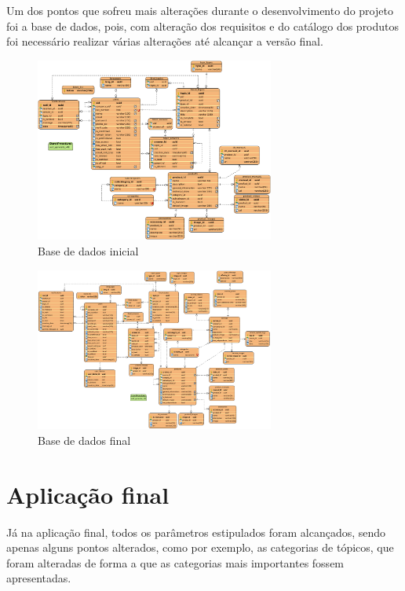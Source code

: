 Um dos pontos que sofreu mais alterações durante o desenvolvimento do projeto foi a base de dados, pois, com alteração dos requisitos e do catálogo dos produtos foi necessário realizar várias alterações até alcançar a versão final.

\begin{figure}[htb]
  \centering
  \includegraphics[width=0.7\textwidth]{images/diagramas/diagrama_bd.png}
  \caption{Base de dados inicial}
  \label{fig:79}
\end{figure}

\begin{figure}[htb]
  \centering
  \includegraphics[width=0.7\textwidth]{images/diagramas/bd_final.png}
  \caption{Base de dados final}
  \label{fig:80}
\end{figure}


\section{Aplicação final}
Já na aplicação final, todos os parâmetros estipulados foram alcançados, sendo apenas alguns pontos alterados, como por exemplo, as categorias de tópicos, que foram alteradas de forma a que as categorias mais importantes fossem apresentadas.



